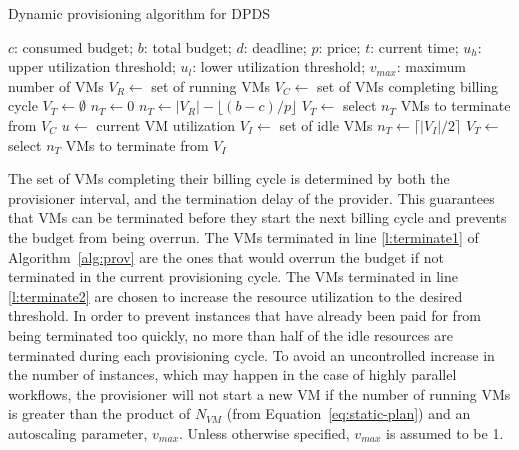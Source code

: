 \documentclass[conference]{IEEEtran}
\begin{document}
\begin{algorithm}[tb]
\caption{Dynamic provisioning algorithm for DPDS}
\label{alg:prov}
{\footnotesize
\begin{algorithmic}[1]
\Require $c$: consumed budget; $b$: total budget; $d$: deadline; $p$: price;
$t$: current time; $u_h$: upper utilization threshold; $u_l$: lower utilization
threshold; $v_{max}$: maximum number of VMs
  \State $V_R\gets$ set of running VMs
    \State $V_C\gets$ set of VMs completing billing cycle
    \State $V_T\gets \emptyset$ 
    \State $n_T\gets 0$ 
      \State $n_T\gets |V_R| - \lfloor(b-c)/p\rfloor$
      \State $V_T\gets$ select $n_T$ VMs to terminate from $V_C$
      \State {} \label{l:terminate1}
    \Else 
    \State $u\gets$ current VM utilization
        \State {}
        \State $V_I\gets$ set of idle VMs
        \State $n_T\gets \lceil|V_I|/2\rceil$ \label{l:nT2}
      \State $V_T\gets$ select $n_T$ VMs to terminate from $V_I$
        \State {} \label{l:terminate2}
      \EndIf 
    \EndIf
\EndProcedure
\end{algorithmic}
}
\end{algorithm}

The set of VMs completing their billing cycle is determined by  both
the provisioner interval, and the termination delay of the provider. This
guarantees that VMs can be terminated before they start the next billing cycle
and prevents the budget from being overrun. The VMs terminated in line
\ref{l:terminate1} of Algorithm~\ref{alg:prov} are the ones that would overrun
the budget if not terminated in the current provisioning cycle. The VMs
terminated in line \ref{l:terminate2} are chosen to increase the resource
utilization to the desired threshold. In order to prevent instances that have
already been paid for from being terminated too quickly, no more than half of
the idle resources are terminated during each provisioning cycle. To avoid an
uncontrolled increase in the number of instances, which may happen in the case
of highly parallel workflows, the provisioner will not start a new VM if the
number of running VMs is greater than the product of $N_{VM}$ (from
Equation~\ref{eq:static-plan}) and an autoscaling parameter, $v_{max}$. Unless
otherwise specified, $v_{max}$ is assumed to be 1.
\end{document}
